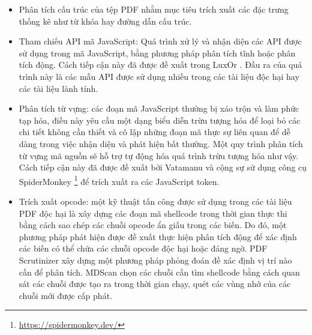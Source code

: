 \documentclass[./../main.tex]{subfiles}
\begin{document}
\begin{itemize}
	\item Phân tích cấu trúc của tệp PDF nhằm mục tiêu trích xuất các đặc trưng thống kê như từ khóa hay đường dẫn cấu trúc.
	\item Tham chiếu API mã JavaScript:  Quá trình xử lý và nhận diện các API được sử dụng trong mã JavaScript, bằng phương pháp phân tích tĩnh hoặc phân tích động. Cách tiếp cận này đã được đề xuất trong LuxOr \cite{luxor}. Đầu ra của quá trình này là các mẫu API được sử dụng nhiều trong các tài liệu độc hại hay các tài liệu lành tính.
	\item Phân tích từ vựng: các đoạn mã JavaScript thường bị xáo trộn và làm phức tạp hóa, điều này yêu cầu một dạng biểu diễn trừu tượng hóa để loại bỏ các chi tiết không cần thiết và cô lập những đoạn mã thực sự liên quan để dễ dàng trong việc nhận diện và phát hiện bất thường. Một quy trình phân tích từ vựng mã nguồn sẽ hỗ trợ tự động hóa quá trình trừu tượng hóa như vậy. Cách tiếp cận này đã được đề xuất bởi Vatamanu và cộng sự \cite{vatamanu} sử dụng công cụ SpiderMonkey \footnote{\url{https://spidermonkey.dev/}} để trích xuất ra các JavaScript token.
	\item Trích xuất opcode: một kỹ thuật tấn công được sử dụng trong các tài liệu PDF độc hại là xây dựng các đoạn mã shellcode trong thời gian thực thi bằng cách sao chép các chuỗi opcode ẩn giấu trong các biến. Do đó, một phương pháp phát hiện được đề xuất thực hiện phân tích động để xác định các biến có thể chứa các chuỗi opcode độc hại hoặc đáng ngờ. PDF Scrutinizer \cite{scrutinizer} xây dựng một phương pháp phỏng đoán đề xác định vị trí nào cần để phân tích. MDScan \cite{mdscan} chọn các chuỗi cần tìm shellcode bằng cách quan sát các chuỗi được tạo ra trong thời gian chạy, quét các vùng nhớ của các chuỗi mới được cấp phát.

\end{itemize}
\end{document}

